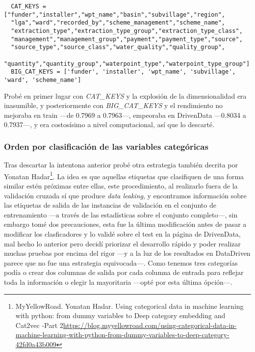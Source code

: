 \documentclass{article}
\begin{document}
\begin{verbatim}
  CAT_KEYS = ["funder","installer","wpt_name","basin","subvillage","region",
  "lga","ward","recorded_by","scheme_management","scheme_name",
  "extraction_type","extraction_type_group","extraction_type_class",
  "management","management_group","payment","payment_type","source",
  "source_type","source_class","water_quality","quality_group",
  "quantity","quantity_group","waterpoint_type","waterpoint_type_group"]
  BIG_CAT_KEYS = ['funder', 'installer', 'wpt_name', 'subvillage', 'ward', 'scheme_name']
\end{verbatim}

Probé en primer lugar con \textit{CAT\_KEYS} y la explosión de la dimensionalidad era inasumible, y posteriormente con \textit{BIG\_CAT\_KEYS} y el rendimiento no mejoraba en train ---de 0.7969 a 0.7963---, empeoraba en DrivenData ---0.8034 a 0.7937---, y era costosísimo a nivel computacional, así que lo descarté.

\subsubsection{Orden por clasificación de las variables categóricas}

Tras descartar la intentona anterior probé otra estrategia también decrita por Yonatan Hadar\footnote{MyYellowRoad. Yonatan Hadar. Using categorical data in machine learning with python: from dummy variables to Deep category embedding and Cat2vec -Part 2\url{https://blog.myyellowroad.com/using-categorical-data-in-machine-learning-with-python-from-dummy-variables-to-deep-category-42fd0a43b009}}. La idea es que aquellas etiquetas que clasifiquen de una forma similar estén próximas entre ellas, este procedimiento, al realizarlo fuera de la validación cruzada sí que produce \textit{data leaking}, y encontramos información sobre las etiquetas de salida de las instancias de validación en el conjunto de entrenamiento ---a través de las estadísticas sobre el conjunto completo---, sin embargo tomé dos precauciones, esta fue la última modificación antes de pasar a modificar los clasficadores y lo validé sobre el test en la página de DrivenData, mal hecho lo anterior pero decidí priorizar el desarrollo rápido y poder realizar muchas pruebas por encima del rigor ---y a la luz de los resultados en DataDriven parece que no fue una estrategia equivocada---. Como tenemos tres categorías podía o crear dos columnas de salida por cada columna de entrada para reflejar toda la información o elegir la mayoritaria ---opté por esta última ópción---.
\end{document}
